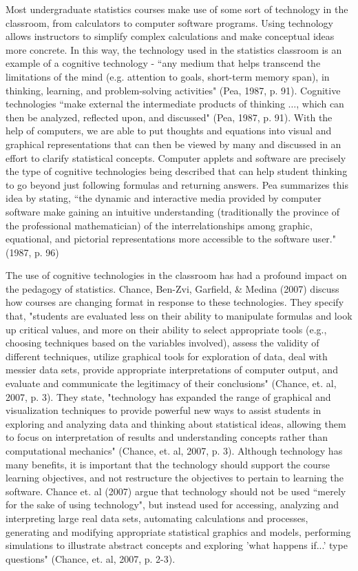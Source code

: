 \documentclass[11pt]{book}
\begin{document}
	Most undergraduate statistics courses make use of some sort of technology in the classroom, from calculators to computer software programs. Using technology allows instructors to simplify complex calculations and make conceptual ideas more concrete. In this way, the technology used in the statistics classroom is an example of a cognitive technology - ``any medium that helps transcend the limitations of the mind (e.g. attention to goals, short-term memory span), in thinking, learning, and problem-solving activities" (Pea, 1987, p. 91). Cognitive technologies ``make external the intermediate products of thinking $\ldots$, which can then be analyzed, reflected upon, and discussed" (Pea, 1987, p. 91). With the help of computers, we are able to put thoughts and equations into visual and graphical representations that can then be viewed by many and discussed in an effort to clarify statistical concepts. Computer applets and software are precisely the type of cognitive technologies being described that can help student thinking to go beyond just following formulas and returning answers.  Pea summarizes this idea by stating, ``the dynamic and interactive media provided by computer software make gaining an intuitive understanding (traditionally the province of the professional mathematician) of the interrelationships among graphic, equational, and pictorial representations more accessible to the software user."(1987, p. 96)  
		
The use of cognitive technologies in the classroom has had a profound impact on the pedagogy of statistics. Chance, Ben-Zvi, Garfield, \& Medina (2007) discuss how courses are changing format in response to these technologies. They specify that, "students are evaluated less on their ability to manipulate formulas and look up critical values, and more on their ability to select appropriate tools (e.g., choosing techniques based on the variables involved), assess the validity of different techniques, utilize graphical tools for exploration of data, deal with messier data sets, provide appropriate interpretations of computer output, and evaluate and communicate the legitimacy of their conclusions" (Chance, et. al, 2007, p. 3).  They state, "technology has expanded the range of graphical and visualization techniques to provide powerful new ways to assist students in exploring and analyzing data and thinking about statistical ideas, allowing them to focus on interpretation of results and understanding concepts rather than computational mechanics" (Chance, et. al, 2007, p. 3). Although technology has many benefits, it is important that the technology should support the course learning objectives, and not restructure the objectives to pertain to learning the software.  Chance et. al (2007) argue that technology should not be used ``merely for the sake of using technology",  but instead used for accessing, analyzing and interpreting large real data sets, automating calculations and processes, generating and modifying appropriate statistical graphics and models, performing simulations to illustrate abstract concepts and exploring 'what happens if...' type questions" (Chance, et. al, 2007, p. 2-3).
\end{document}

